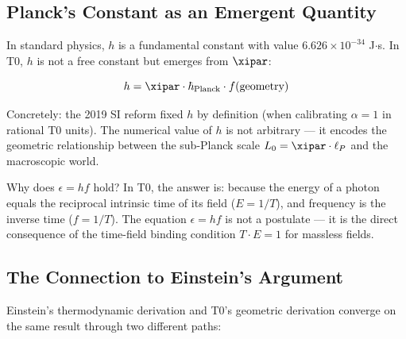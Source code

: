 \subsection{Planck's Constant as an Emergent Quantity}

In standard physics, $h$ is a fundamental constant with value 
$6.626 \times 10^{-34}$ J$\cdot$s. In T0, $h$ is not a free constant but 
emerges from $\xipar$:

\begin{equation}
    h = \xipar \cdot \hbar_{\text{Planck}} \cdot f(\text{geometry})
    \label{eq:h_from_xi}
\end{equation}

Concretely: the 2019 SI reform fixed $h$ by definition (when calibrating $\alpha = 1$ 
in rational T0 units). The numerical value of $h$ is not arbitrary — it encodes the 
geometric relationship between the sub-Planck scale $L_0 = \xipar \cdot \ell_P$ 
and the macroscopic world.

\begin{keyresult}
    Why does $\epsilon = hf$ hold? In T0, the answer is: because the energy of a 
    photon equals the reciprocal intrinsic time of its field ($E = 1/T$), and 
    frequency is the inverse time ($f = 1/T$). The equation $\epsilon = hf$ is not 
    a postulate — it is the direct consequence of the time-field binding condition 
    $T \cdot E = 1$ for massless fields.
\end{keyresult}

\subsection{The Connection to Einstein's Argument}

Einstein's thermodynamic derivation and T0's geometric derivation converge on the 
same result through two different paths:

\begin{table}[h]
    \centering
    \caption{Two paths to the equation $\epsilon = hf$}
    \label{tab:two_ways}
\end{table}

